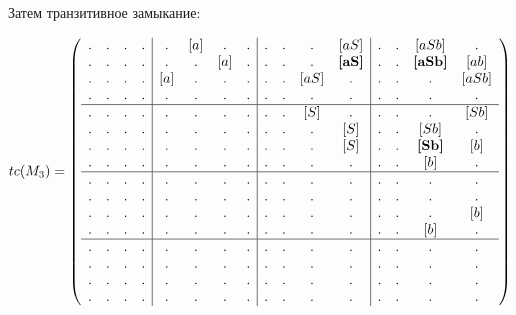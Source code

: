 \begin{example}
Затем транзитивное замыкание:

\begin{align}
tc(M_3) =
\left(\begin{array}{c c c c | c c c c | c c c c | c c c c } 
. & . & . & .  &  . & [a] & . & .  &  . & . & . & [aS]           &  . & . & [aSb]          & .     \\
. & . & . & .  &  . & . & [a] & .  &  . & . & . & \textbf{[aS]}  &  . & . & \textbf{[aSb]} & [ab]  \\
. & . & . & .  &  [a] & . & . & .  &  . & . & [aS] & .           &  . & . & .              & [aSb] \\
. & . & . & .  &  . & . & . & .    &  . & . & . & .              &  . & . & .              & .     \\
\hline
. & . & . & .  &  . & . & . & .    &  . & . & [S] & .            &  . & . & .             & [Sb]    \\
. & . & . & .  &  . & . & . & .    &  . & . & . & [S]            &  . & . & [Sb]          & .    \\
. & . & . & .  &  . & . & . & .    &  . & . & . & [S]            &  . & . & \textbf{[Sb]} & [b]  \\
. & . & . & .  &  . & . & . & .    &  . & . & . & .              &  . & . & [b]           & .    \\
\hline                                                              
. & . & . & .  &  . & . & . & .    &  . & . & . & .              &  . & . & . & .   \\
. & . & . & .  &  . & . & . & .    &  . & . & . & .              &  . & . & . & .   \\
. & . & . & .  &  . & . & . & .    &  . & . & . & .              &  . & . & . & [b] \\
. & . & . & .  &  . & . & . & .    &  . & . & . & .              &  . & . & [b] & . \\
\hline                                                              
. & . & . & .  &  . & . & . & .    &  . & . & . & .              &  . & . & . & .   \\
. & . & . & .  &  . & . & . & .    &  . & . & . & .              &  . & . & . & .   \\
. & . & . & .  &  . & . & . & .    &  . & . & . & .              &  . & . & . & .   \\
. & . & . & .  &  . & . & . & .    &  . & . & . & .              &  . & . & . & . 
\end{array}\right)
\label{eq:graph_tm}
\end{align}


\end{example}
